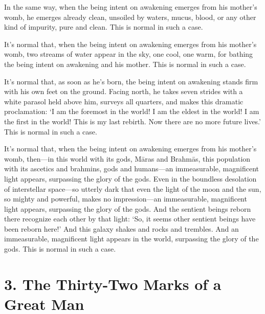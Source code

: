 \documentclass[12pt,openany]{book}%
\begin{document}
In the same way, when the being intent on awakening emerges from his mother’s womb, he emerges already clean, unsoiled by waters, mucus, blood, or any other kind of impurity, pure and clean. This is normal in such a case. 

It’s normal that, when the being intent on awakening emerges from his mother’s womb, two streams of water appear in the sky, one cool, one warm, for bathing the being intent on awakening and his mother. This is normal in such a case. 

It’s normal that, as soon as he’s born, the being intent on awakening stands firm with his own feet on the ground. Facing north, he takes seven strides with a white parasol held above him, surveys all quarters, and makes this dramatic proclamation: ‘I am the foremost in the world! I am the eldest in the world! I am the first in the world! This is my last rebirth. Now there are no more future lives.’ This is normal in such a case. 

It’s normal that, when the being intent on awakening emerges from his mother’s womb, then—in this world with its gods, \textsanskrit{Māras} and \textsanskrit{Brahmās}, this population with its ascetics and brahmins, gods and humans—an immeasurable, magnificent light appears, surpassing the glory of the gods. Even in the boundless desolation of interstellar space—so utterly dark that even the light of the moon and the sun, so mighty and powerful, makes no impression—an immeasurable, magnificent light appears, surpassing the glory of the gods. And the sentient beings reborn there recognize each other by that light: ‘So, it seems other sentient beings have been reborn here!’ And this galaxy shakes and rocks and trembles. And an immeasurable, magnificent light appears in the world, surpassing the glory of the gods. This is normal in such a case. 

\section*{3. The Thirty-Two Marks of a Great Man }
\end{document}
